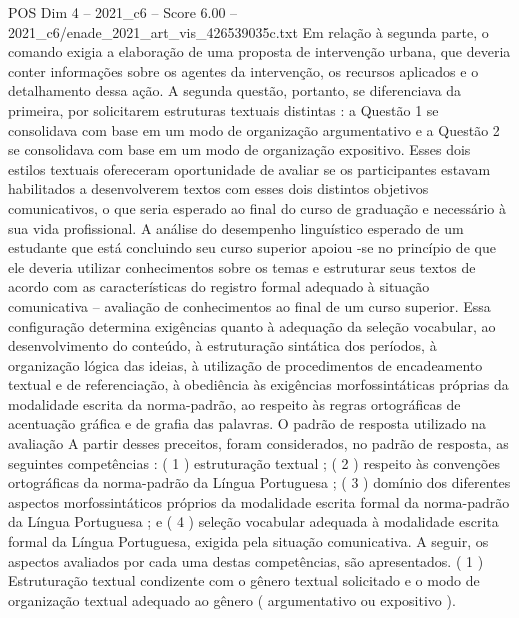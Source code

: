 \begin{textsample}{POS Dim 4 – 2021\_c6 – Score 6.00 – 2021\_c6/enade\_2021\_art\_vis\_426539035c.txt}
Em relação à segunda parte, o comando exigia a elaboração de uma proposta de intervenção urbana, que deveria conter informações sobre os agentes da intervenção, os recursos aplicados e o detalhamento dessa ação.
A segunda questão, portanto, se diferenciava da primeira, por solicitarem estruturas textuais distintas : a Questão 1 se consolidava com base em um modo de organização argumentativo e a Questão 2 se consolidava com base em um modo de organização expositivo.
Esses dois estilos textuais ofereceram oportunidade de avaliar se os participantes estavam habilitados a desenvolverem textos com esses dois distintos objetivos comunicativos, o que seria esperado ao final do curso de graduação e necessário à sua vida profissional.
A análise do desempenho linguístico esperado de um estudante que está concluindo seu curso superior apoiou -se no princípio de que ele deveria utilizar conhecimentos sobre os temas e estruturar seus textos de acordo com as características do registro formal adequado à situação comunicativa – avaliação de conhecimentos ao final de um curso superior.
Essa configuração determina exigências quanto à adequação da seleção vocabular, ao desenvolvimento do conteúdo, à estruturação sintática dos períodos, à organização lógica das ideias, à utilização de procedimentos de encadeamento textual e de referenciação, à obediência às exigências morfossintáticas próprias da modalidade escrita da norma-padrão, ao respeito às regras ortográficas de acentuação gráfica e de grafia das palavras.
O padrão de resposta utilizado na avaliação A partir desses preceitos, foram considerados, no padrão de resposta, as seguintes competências : ( 1 ) estruturação textual ; ( 2 ) respeito às convenções ortográficas da norma-padrão da Língua Portuguesa ; ( 3 ) domínio dos diferentes aspectos morfossintáticos próprios da modalidade escrita formal da norma-padrão da Língua Portuguesa ; e ( 4 ) seleção vocabular adequada à modalidade escrita formal da Língua Portuguesa, exigida pela situação comunicativa.
A seguir, os aspectos avaliados por cada uma destas competências, são apresentados. ( 1 ) Estruturação textual condizente com o gênero textual solicitado e o modo de organização textual adequado ao gênero ( argumentativo ou expositivo ).

\end{textsample}
